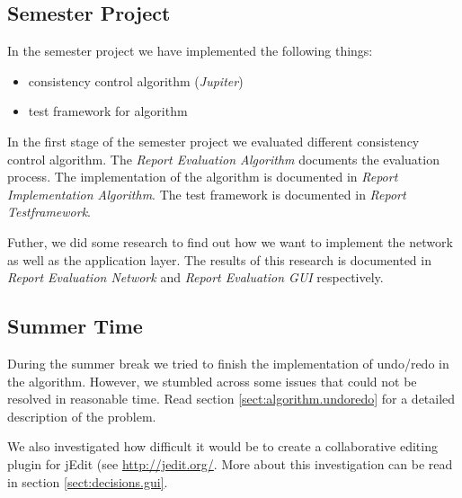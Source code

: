 \subsection{Semester Project}
In the semester project we have implemented the following things:
\begin{itemize}
 \item consistency control algorithm (\emph{Jupiter})
 \item test framework for algorithm
\end{itemize}

In the first stage of the semester project we evaluated different
consistency control algorithm. The \emph{Report Evaluation Algorithm}
documents the evaluation process. The implementation of the
algorithm is documented in \emph{Report Implementation Algorithm}. The
test framework is documented in \emph{Report Testframework}.

Futher, we did some research to find out how we want to implement the
network as well as the application layer. The results of this research
is documented in \emph{Report Evaluation Network} and 
\emph{Report Evaluation GUI} respectively.


\subsection{Summer Time}
During the summer break we tried to finish the implementation of undo/redo
in the algorithm. However, we stumbled across some issues that could not
be resolved in reasonable time. Read section \ref{sect:algorithm.undoredo} for
a detailed description of the problem.

We also investigated how difficult it would be to create a collaborative 
editing plugin for jEdit (see \href{http://jedit.org/}{http://jedit.org/}.
More about this investigation can be read in section 
\ref{sect:decisions.gui}.

